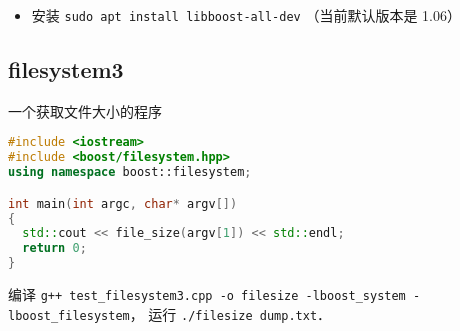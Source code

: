 
\begin{itemize}
\item 安装 \verb|sudo apt install libboost-all-dev| （当前默认版本是 1.06）
\end{itemize}

\subsection{filesystem3}
一个获取文件大小的程序
\begin{lstlisting}[language=cpp]
#include <iostream>
#include <boost/filesystem.hpp>
using namespace boost::filesystem;

int main(int argc, char* argv[])
{
  std::cout << file_size(argv[1]) << std::endl;
  return 0;
}
\end{lstlisting}

编译 \verb|g++ test_filesystem3.cpp -o filesize -lboost_system -lboost_filesystem|， 运行 \verb|./filesize dump.txt|．